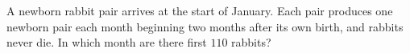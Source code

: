 A newborn rabbit pair arrives at the start of January. Each pair produces one newborn pair each month beginning two months after its own birth, and rabbits never die. In which month are there first $110$ rabbits?
